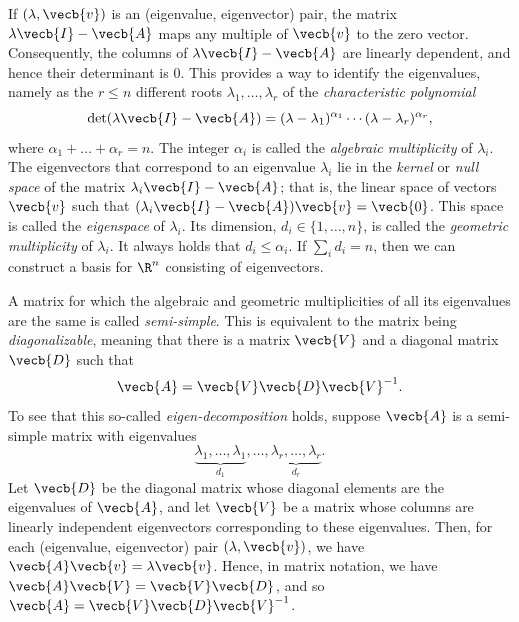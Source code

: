 If $(\lambda, \vecb{v})$ is an (eigenvalue, eigenvector) pair, the matrix $\lambda \vecb{I} - \vecb{A}$ maps any multiple of $\vecb{v}$ to the zero vector. Consequently, the columns of $\lambda \vecb{I} - \vecb{A}$ are linearly dependent, and hence their determinant is 0. This provides a way to identify the eigenvalues, namely as the $r \le n$ different roots $\lambda_1, \dots, \lambda_r$ of the \textit{characteristic polynomial}
\begin{equation*}
	\det(\lambda \vecb{I} - \vecb{A}) = (\lambda - \lambda_1)^{\alpha_1} \cdots (\lambda - \lambda_r)^{\alpha_r},
\end{equation*}
where $\alpha_1 + \dots + \alpha_r = n$. The integer $\alpha_i$ is called the \textit{algebraic multiplicity} of $\lambda_i$. The eigenvectors that correspond to an eigenvalue $\lambda_i$ lie in the \textit{kernel} or \textit{null space} of the matrix $\lambda_i \vecb{I} - \vecb{A}$; that is, the linear space of vectors $\vecb{v}$ such that $(\lambda_i \vecb{I} - \vecb{A})\vecb{v} = \vecb{0}$. This space is called the \textit{eigenspace} of $\lambda_i$. Its dimension, $d_i \in \{1, \dots, n\}$, is called the \textit{geometric multiplicity} of $\lambda_i$. It always holds that $d_i \le \alpha_i$. If $\sum_i d_i = n$, then we can construct a basis for $\R^n$ consisting of eigenvectors.

A matrix for which the algebraic and geometric multiplicities of all its eigenvalues are the same is called \textit{semi-simple}. This is equivalent to the matrix being \textit{diagonalizable}, meaning that there is a matrix $\vecb{V}$ and a diagonal matrix $\vecb{D}$ such that
\begin{equation*}
	\vecb{A} = \vecb{V} \vecb{D} \vecb{V}^{-1}.
\end{equation*}
To see that this so-called \textit{eigen-decomposition} holds, suppose $\vecb{A}$ is a semi-simple matrix with eigenvalues
\begin{equation*}
	\underbrace{\lambda_1, \dots, \lambda_1}_{d_1}, \dots, \underbrace{\lambda_r, \dots, \lambda_r}_{d_r}.
\end{equation*}
Let $\vecb{D}$ be the diagonal matrix whose diagonal elements are the eigenvalues of $\vecb{A}$, and let $\vecb{V}$ be a matrix whose columns are linearly independent eigenvectors corresponding to these eigenvalues. Then, for each (eigenvalue, eigenvector) pair $(\lambda, \vecb{v})$, we have $\vecb{A}\vecb{v} = \lambda \vecb{v}$. Hence, in matrix notation, we have $\vecb{A}\vecb{V} = \vecb{V}\vecb{D}$, and so $\vecb{A} = \vecb{V}\vecb{D}\vecb{V}^{-1}$.

